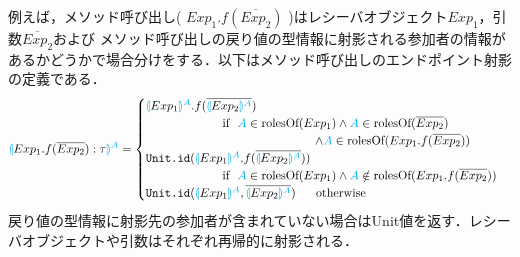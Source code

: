 \documentclass{thesis}
\newcommand{\projection}[2]{{\color{cyan}\llparenthesis}#1{\color{cyan}\rrparenthesis^#2}}
\newcommand{\mblue}[1]{\textbf{\textsf{\color{MidnightBlue}#1}}}
\newcommand{\cyan}[1]{\color{cyan}#1}
\begin{document}
例えば，メソッド呼び出し( $Exp_1.f(\overline{Exp_2})$ )はレシーバオブジェクト$Exp_1$，引数$\overline{Exp_2}$および
メソッド呼び出しの戻り値の型情報に射影される参加者の情報があるかどうかで場合分けをする．以下はメソッド呼び出しのエンドポイント射影の定義である．
\begin{alignat*}{2} 
  &\projection{Exp_1.f(\overline{Exp_2}):\tau}{A}=
  \begin{cases}
    \projection{Exp_1}{A}.f(\overline{\projection{Exp_2}{A}}) \\
    ~~~~~~~~~~~~~~~~~~~\text{if}~~ {\color{cyan}A} \in \text{rolesOf}(Exp_1) \wedge {\color{cyan}A} \in \text{rolesOf}(\overline{Exp_2})\\
    ~~~~~~~~~~~~~~~~~~~~~~~~~~~~~~~~~~~~~~~~~~ \wedge {\color{cyan}A} \in \text{rolesOf}(Exp_1.f(\overline{Exp_2}))\\
    \texttt{Unit.id}(\projection{Exp_1}{A}.f(\overline{\projection{Exp_2}{A}})) \\
    ~~~~~~~~~~~~~~~~~~~\text{if}~~ {\color{cyan}A} \in \text{rolesOf}(Exp_1) \wedge {\color{cyan}A} \notin \text{rolesOf}(Exp_1.f(\overline{Exp_2}))\\
    \texttt{Unit.id}(\projection{Exp_1}{A},\overline{\projection{Exp_2}{A}}) ~~~~~\text{otherwise}
  \end{cases}\\
\end{alignat*}
戻り値の型情報に射影先の参加者が含まれていない場合は\textsf{Unit}値を返す．レシーバオブジェクトや引数はそれぞれ再帰的に射影される．
\end{document}

